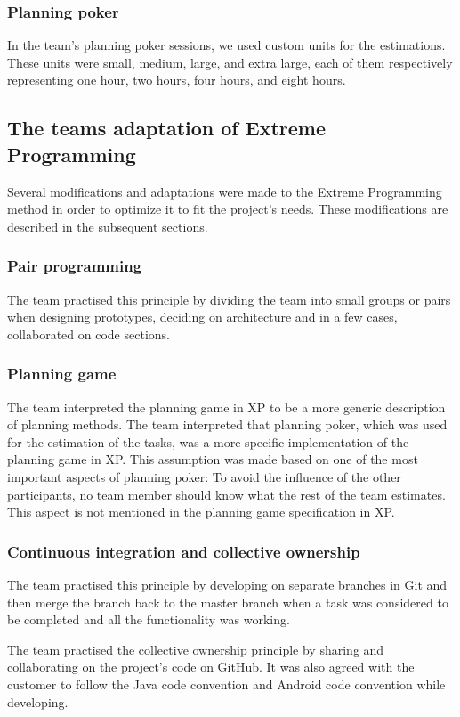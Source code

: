 \subsubsection{Planning poker}
In the team's planning poker sessions, we used custom units for the estimations. These units were small, medium, large, and extra large, each of them respectively representing one hour, two hours, four hours, and eight hours.

\subsection{The teams adaptation of Extreme Programming}
\label{sec:adapExtremeProgr}
Several modifications and adaptations were made to the Extreme Programming method in order to optimize it to fit the project's needs. These modifications are described in the subsequent sections.

\subsubsection{Pair programming}
The team practised this principle by dividing the team into small groups or pairs when designing prototypes, deciding on architecture and in a few cases, collaborated on code sections.

\subsubsection{Planning game}
The team interpreted the planning game in XP to be a more generic description of planning methods. The team interpreted that planning poker, which was used for the estimation of the tasks, was a more specific implementation of the planning game in XP. This assumption was made based on one of the most important aspects of planning poker: To avoid the influence of the other participants, no team member should know what the rest of the team estimates. This aspect is not mentioned in the planning game specification in XP.

\subsubsection{Continuous integration and collective ownership}
The team practised this principle by developing on separate branches in Git and then merge the branch back to the master branch when a task was considered to be completed and all the functionality was working.

The team practised the collective ownership principle by sharing and collaborating on the project's code on GitHub. It was also agreed with the customer to follow the Java code convention and Android code convention while developing.

